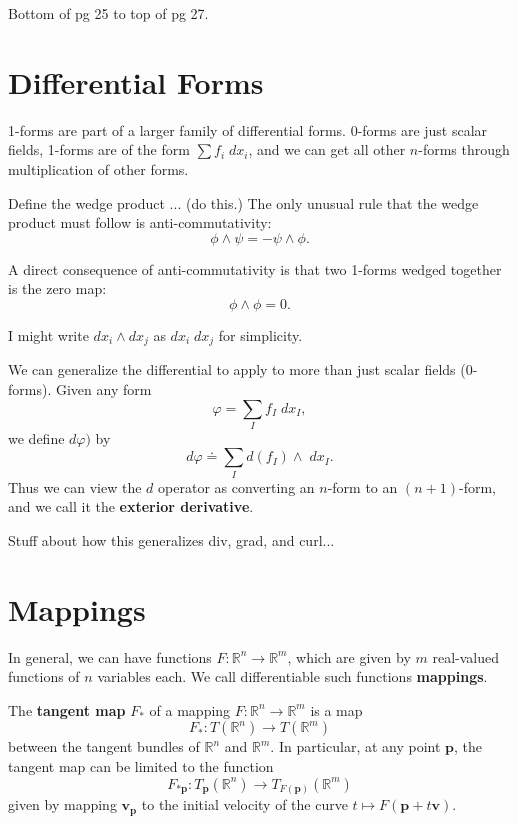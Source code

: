 \documentclass[10pt]{report}
\begin{document}
{\color{red}Bottom of pg 25 to top of pg 27.}


\section{Differential Forms}

1-forms are part of a larger family of differential forms. 0-forms are just scalar fields, 1-forms are of the form $\sum f_i \;dx_i$, and we can get all other $n$-forms through multiplication of other forms.

Define the wedge product ... {\color{red}(do this.)} The only unusual rule that the wedge product must follow is anti-commutativity:
\[
\phi \wedge \psi = - \psi \wedge \phi.
\] 

\begin{ex}
A direct consequence of anti-commutativity is that two 1-forms wedged together is the zero map:
\[
\phi\wedge\phi = 0.
\] 
\end{ex}

\begin{note}
I might write $dx_i \wedge dx_j$ as $dx_i\;dx_j$ for simplicity.
\end{note}

We can generalize the differential to apply to more than just scalar fields (0-forms). Given any form
\[
\varphi = \sum_{I} f_I \;dx_I,
\] we define $d\varphi)$ by
\[
	d\varphi \doteq \sum_{I} d(f_I)\wedge \;dx_I.
\] 
Thus we can view the $d$ operator as converting an $n$-form to an $(n+1)$-form, and we call it the \textbf{exterior derivative}.

{\color{red}Stuff about how this generalizes div, grad, and curl...}


\section{Mappings}

In general, we can have functions $F:\mathbb{R}^n\to \mathbb{R}^m$, which are given by $m$ real-valued functions of $n$ variables each. We call differentiable such functions \textbf{mappings}.

\begin{defn}
The \textbf{tangent map} $F_*$ of a mapping $F:\mathbb{R}^n\to \mathbb{R}^m$ is a map
\[
	F_* : T(\mathbb{R}^n) \to T(\mathbb{R}^m)
\] between the tangent bundles of $\mathbb{R}^n$ and $\mathbb{R}^m$. In particular, at any point $\mathbf{p}$, the tangent map can be limited to the function
\[
	F_{*\mathbf{p}}:T_{\mathbf{p}}(\mathbb{R}^n)\to T_{F(\mathbf{p})}(\mathbb{R}^m)
\]
given by mapping $\mathbf{v}_{\mathbf{p}}$ to the initial velocity of the curve $t\mapsto F(\mathbf{p}+t\mathbf{v})$.
\end{defn}
\end{document}
